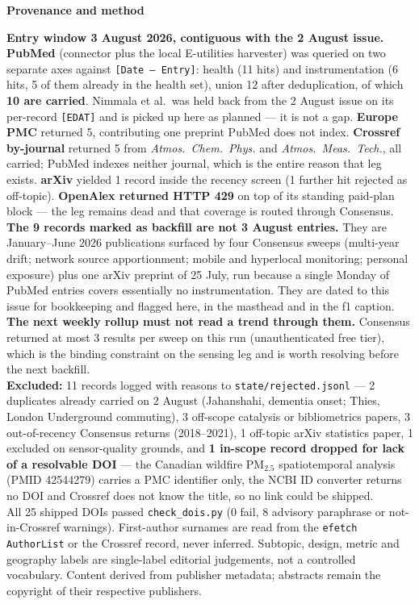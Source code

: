 \documentclass[10pt]{article}
\begin{document}
\vspace{4mm}
\begin{keybox}
{\sffamily\bfseries\footnotesize\color{Deep}Provenance and method}\\[1.2mm]
{\fontsize{7.2}{8.8}\selectfont
\textbf{Entry window 3 August 2026, contiguous with the 2 August issue.}
\textbf{PubMed} (connector plus the local E-utilities harvester) was queried on two
separate axes against \texttt{[Date -- Entry]}: health (11 hits) and instrumentation
(6 hits, 5 of them already in the health set), union 12 after deduplication, of which
\textbf{10 are carried}. Nimmala et al.\ was held back from the 2 August issue on its
per-record \texttt{[EDAT]} and is picked up here as planned --- it is not a gap.
\textbf{Europe PMC} returned 5, contributing one preprint PubMed does not index.
\textbf{Crossref by-journal} returned 5 from \textit{Atmos.\ Chem.\ Phys.} and
\textit{Atmos.\ Meas.\ Tech.}, all carried; PubMed indexes neither journal, which is the
entire reason that leg exists. \textbf{arXiv} yielded 1 record inside the recency screen
(1 further hit rejected as off-topic). \textbf{OpenAlex returned HTTP 429} on top of its
standing paid-plan block --- the leg remains dead and that coverage is routed through
Consensus.\\[1.0mm]
\textbf{The 9 records marked as backfill are not 3 August entries.} They are
January--June 2026 publications surfaced by four Consensus sweeps (multi-year drift;
network source apportionment; mobile and hyperlocal monitoring; personal exposure) plus
one arXiv preprint of 25 July, run because a single Monday of PubMed entries covers
essentially no instrumentation. They are dated to this issue for bookkeeping and flagged
here, in the masthead and in the f1 caption. \textbf{The next weekly rollup must not read
a trend through them.} Consensus returned at most 3 results per sweep on this run
(unauthenticated free tier), which is the binding constraint on the sensing leg and is
worth resolving before the next backfill.\\[1.0mm]
\textbf{Excluded:} 11 records logged with reasons to \texttt{state/rejected.jsonl} ---
2 duplicates already carried on 2 August (Jahanshahi, dementia onset; Thies, London
Underground commuting), 3 off-scope catalysis or bibliometrics papers, 3 out-of-recency
Consensus returns (2018--2021), 1 off-topic arXiv statistics paper, 1 excluded on
sensor-quality grounds, and \textbf{1 in-scope record dropped for lack of a resolvable
DOI} --- the Canadian wildfire PM$_{2.5}$ spatiotemporal analysis (PMID 42544279) carries a
PMC identifier only, the NCBI ID converter returns no DOI and Crossref does not know the
title, so no link could be shipped.\\[1.0mm]
All 25 shipped DOIs passed \texttt{check\_dois.py} (0 fail, 8 advisory paraphrase or
not-in-Crossref warnings). First-author surnames are read from the \texttt{efetch}
\texttt{AuthorList} or the Crossref record, never inferred. Subtopic, design, metric and
geography labels are single-label editorial judgements, not a controlled vocabulary.
Content derived from publisher metadata; abstracts remain the copyright of their
respective publishers.\par}
\end{keybox}
\end{document}
